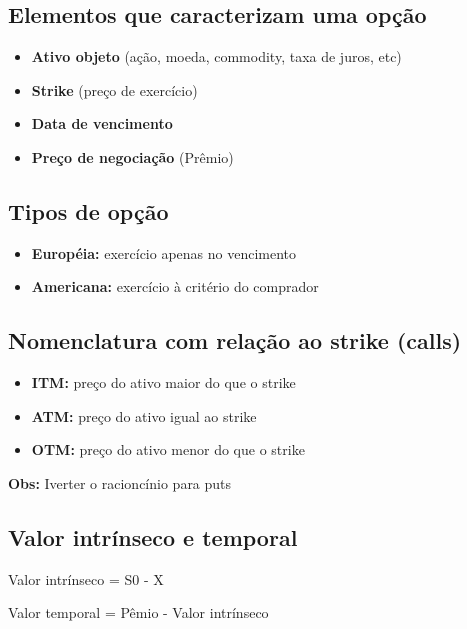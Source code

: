 \documentclass{sciposter}
\begin{document}
\begin{multicols}{3}
\vspace{0.75 cm}
\subsection*{Elementos que caracterizam uma opção}
\begin{itemize}
    \item \textbf{Ativo objeto} (ação, moeda, commodity, taxa de juros, etc)
    \item \textbf{Strike} (preço de exercício)
    \item \textbf{Data de vencimento}
    \item \textbf{Preço de negociação} (Prêmio)
\end{itemize}

\vspace{0.75 cm}
\subsection*{\textbf{Tipos de opção}}
\begin{itemize}
    \item \textbf{Européia:} exercício apenas no vencimento
\end{itemize}
\begin{itemize}
    \item \textbf{Americana:} exercício à critério do comprador
\end{itemize}

\vspace{0.75 cm}
\subsection*{\textbf{Nomenclatura com relação ao strike (calls)}}
    \begin{itemize}
        \item \textbf{ITM:} preço do ativo maior do que o strike
        \item \textbf{ATM:} preço do ativo igual ao strike
        \item \textbf{OTM:} preço do ativo menor do que o strike
    \end{itemize}
\textbf{Obs:} Iverter o racioncínio para puts
\item \vspace{0.75 cm}

\subsection*{\textbf{Valor intrínseco e temporal}}
    \begin{center}
    Valor intrínseco = S0 - X
    \end{center}
 \begin{center}
    Valor temporal = Pêmio - Valor intrínseco 
    \end{center}
    \vspace{0.75 cm}

\end{multicols}
\end{document}

